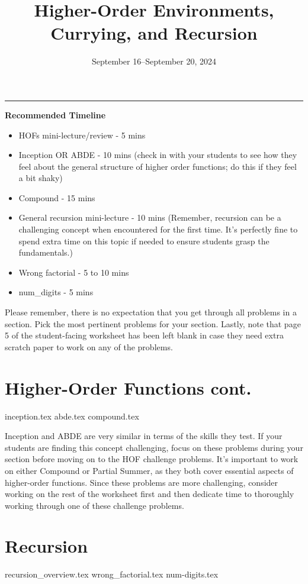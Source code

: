 \documentclass{exam}
\title{Higher-Order Environments, Currying, and Recursion}
\date{September 16--September 20, 2024}
\begin{document}
\maketitle
\rule{\textwidth}{0.15em}
\fontsize{12}{15}\selectfont

\begin{meta}
\textbf{Recommended Timeline}
\begin{itemize}
    \item HOFs mini-lecture/review - 5 mins 
      \item Inception OR ABDE - 10 mins (check in with your students to see how they feel about the general structure of higher order functions; do this if they feel a bit shaky)
    \item Compound - 15 mins
    \item General recursion mini-lecture - 10 mins (Remember, recursion can be a challenging concept when encountered for the first time. It's perfectly fine to spend extra time on this topic if needed to ensure students grasp the fundamentals.)
    \item Wrong factorial - 5 to 10 mins
    \item num\_digits - 5 mins
\end{itemize}
Please remember, there is no expectation that you get through all problems in a section. Pick the most pertinent problems for your section. 
Lastly, note that page 5 of the student-facing worksheet has been left blank in case they need extra scratch paper to work on any of the problems.
\end{meta}

\begin{questions}
    \section{Higher-Order Functions cont.}
    {inception.tex}
    {abde.tex}
    {compound.tex}
    \begin{questionmeta}
        Inception and ABDE are very similar in terms of the skills they test. If your students are finding this concept challenging, focus on these problems during your section before moving on to the HOF challenge problems. It's important to work on either Compound or Partial Summer, as they both cover essential aspects of higher-order functions. Since these problems are more challenging, consider working on the rest of the worksheet first and then dedicate time to thoroughly working through one of these challenge problems.
    \end{questionmeta}

    \section{Recursion}
    {recursion_overview.tex}
    {wrong_factorial.tex}
    {num-digits.tex}
\end{questions}
\end{document}
